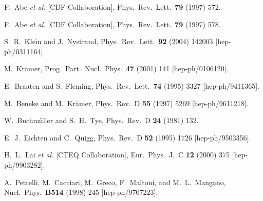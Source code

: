 \begin{thebibliography}{999}

F.~Abe {\it et al.}  [CDF Collaboration],
Phys.\ Rev.\ Lett.\  {\bf 79} (1997) 572.

F.~Abe {\it et al.}  [CDF Collaboration],
Phys.\ Rev.\ Lett.\  {\bf 79} (1997) 578.

S.~R.~Klein and J.~Nystrand,
Phys.\ Rev.\ Lett.\  {\bf 92} (2004) 142003
[hep-ph/0311164].

M.~Kr\"amer,
Prog.\ Part.\ Nucl.\ Phys.\  {\bf 47} (2001) 141
[hep-ph/0106120].

E.~Braaten and S.~Fleming,
Phys.\ Rev.\ Lett.\  {\bf 74} (1995) 3327
[hep-ph/9411365].

M.~Beneke and M.~Kr\"amer,
Phys.\ Rev.\ D {\bf 55} (1997) 5269
[hep-ph/9611218].

W.~Buchm\"uller and S.~H.~Tye,
Phys.\ Rev.\ D {\bf 24} (1981) 132.

E.~J.~Eichten and C.~Quigg,
Phys.\ Rev.\ D {\bf 52} (1995) 1726
[hep-ph/9503356].

H.~L.~Lai {\it et al.}  [CTEQ Collaboration],
Eur.\ Phys.\ J.\ C {\bf 12} (2000) 375
[hep-ph/9903282].

A.~Petrelli, M.~Cacciari, M.~Greco, F.~Maltoni, and M.~L.~Mangano,
Nucl.\ Phys.\ {\bf B514} (1998) 245
[hep-ph/9707223].


\end{thebibliography}
